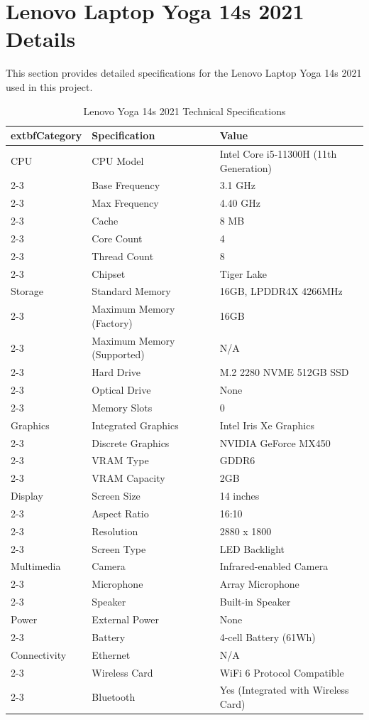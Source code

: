 \section{Lenovo Laptop Yoga 14s 2021 Details}\label{sec:lenovo_details}
This section provides detailed specifications for the Lenovo Laptop Yoga 14s 2021 used in this project.
\begin{table}[htbp]
	\centering
	\caption{Lenovo Yoga 14s 2021 Technical Specifications}
	\label{tab:lenovo_laptop_specs}
	\begin{tabular}{|l|l|p{6.5cm}|}
		\hline
			extbf{Category} & \textbf{Specification} & \textbf{Value} \\
		\hline
		{CPU} & CPU Model & Intel Core i5-11300H (11th Generation) \\
		\cline{2-3} & Base Frequency & 3.1 GHz \\
		\cline{2-3} & Max Frequency & 4.40 GHz \\
		\cline{2-3} & Cache & 8 MB \\
		\cline{2-3} & Core Count & 4 \\
		\cline{2-3} & Thread Count & 8 \\
		\cline{2-3} & Chipset & Tiger Lake \\
		\hline
		{Storage} & Standard Memory & 16GB, LPDDR4X 4266MHz \\
		\cline{2-3} & Maximum Memory (Factory) & 16GB \\
		\cline{2-3} & Maximum Memory (Supported) & N/A \\
		\cline{2-3} & Hard Drive & M.2 2280 NVME 512GB SSD \\
		\cline{2-3} & Optical Drive & None \\
		\cline{2-3} & Memory Slots & 0 \\
		\hline
		{Graphics} & Integrated Graphics & Intel Iris Xe Graphics \\
		\cline{2-3} & Discrete Graphics & NVIDIA GeForce MX450 \\
		\cline{2-3} & VRAM Type & GDDR6 \\
		\cline{2-3} & VRAM Capacity & 2GB \\
		\hline
		{Display} & Screen Size & 14 inches \\
		\cline{2-3} & Aspect Ratio & 16:10 \\
		\cline{2-3} & Resolution & 2880 x 1800 \\
		\cline{2-3} & Screen Type & LED Backlight \\
		\hline
		{Multimedia} & Camera & Infrared-enabled Camera \\
		\cline{2-3} & Microphone & Array Microphone \\
		\cline{2-3} & Speaker & Built-in Speaker \\
		\hline
		{Power} & External Power & None \\
		\cline{2-3} & Battery & 4-cell Battery (61Wh) \\
		\hline
		{Connectivity} & Ethernet & N/A \\
		\cline{2-3} & Wireless Card & WiFi 6 Protocol Compatible \\
		\cline{2-3} & Bluetooth & Yes (Integrated with Wireless Card) \\
		\hline
	\end{tabular}
\end{table}
